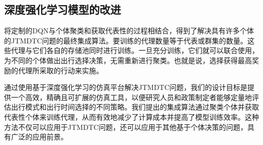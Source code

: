 \subsection{深度强化学习模型的改进}
将定制的DQN与个体聚类和获取代表性的过程相结合，得到了解决具有许多个体的JTMDTC问题的最终集成算法。要训练的代理数量等于代表或群集的数量。这些代理与它们各自的存储池同时进行训练。一旦充分训练，它们就可以联合使用，为不同的个体做出出行选择决策，无需重新进行聚类。也就是说，选择获得最高奖励的代理所采取的行动来实施。

通过使用基于深度强化学习的仿真平台解决JTMDTC问题，我们的设计目标是提供一个高效，精确且可扩展的仿真工具，以便研究人员和政策制定者能够定量地评估出行模式和出行时间选择的不同策略。我们提出的集成算法通过聚类个体并获取代表性个体来训练代理，从而有效地减少了计算成本并提高了模型训练效率。这种方法不仅可以应用于JTMDTC问题，还可以应用于其他基于个体决策的问题，具有广泛的应用前景。


